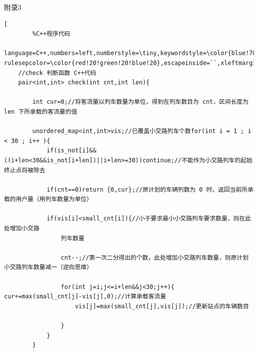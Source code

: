 \documentclass[UTF8]{ctexart}
\begin{document}
\begin{center}
	\sihao \heiti 附录3
	
	
	\fontsize{10pt}{16pt}		\selectfont	
	\begin{lstlisting}[ 
		%C++程序代码
		language=C++,numbers=left,numberstyle=\tiny,keywordstyle=\color{blue!70},commentstyle=\color{red!50!green!50!blue!50},frame=shadowbox, rulesepcolor=\color{red!20!green!20!blue!20},escapeinside=``,xleftmargin=2em,xrightmargin=2em,aboveskip=1em] 
	//check 判断函数 C++代码
	pair<int,int> check(int cnt,int len){
		
		int cur=0;//将客流量以列车数量为单位，得到在列车数目为 cnt，区间长度为 len 下所承载的客流量的值
		
		unordered_map<int,int>vis;//已覆盖小交路列车个数for(int i = 1 ; i < 30 ; i++ ){
			if(is_not[i]&&((i+len<30&&is_not[i+len])||i+len>=30))continue;//不能作为小交路列车的起始终止点将被除去
			
			if(cnt==0)return {0,cur};//原计划的车辆列数为 0 时，返回当前所承载的用户量（用列车数量为单位）
			
			if(vis[i]<small_cnt[i]){//小于要求最小小交路列车要求数量，则在此处增加小交路
				列车数量
				
				cnt--;//第一次二分得出的个数，此处增加小交路列车数量，则原计划小交路列车数量减一（逆向思维）
				
				for(int j=i;j<=i+len&&j<30;j++){ cur+=max(small_cnt[j]-vis[j],0);//计算承载客流量
					vis[j]=max(small_cnt[j],vis[j]);//更新站点的车辆数目
					
				}
			}
		}
	\end{lstlisting}
\end{center}
\end{document}
